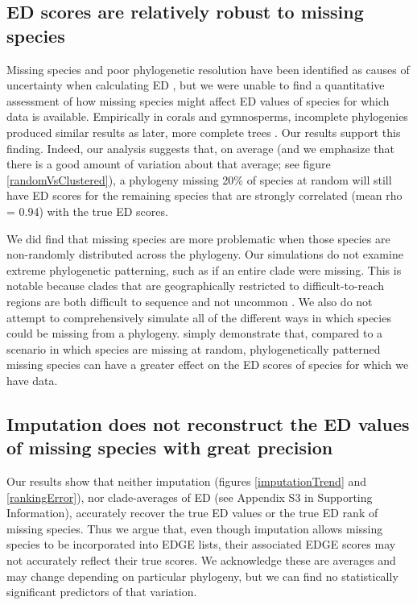 \documentclass[10pt,english]{article}
\begin{document}
\subsection*{ED scores are relatively robust to missing species}
Missing species and poor phylogenetic resolution have been identified as causes
of uncertainty when calculating ED \autocite{Isaac2007}, but we were unable to
find a quantitative assessment of how missing species might affect ED values of
species for which data is available. Empirically in corals and gymnosperms,
incomplete phylogenies produced similar results as later, more complete trees
\autocite{Curnick2015, Forest2018}. Our results support this finding. Indeed,
our analysis suggests that, on average (and we emphasize that there is a good
amount of variation about that average; see figure \ref{randomVsClustered}), a
phylogeny missing 20\% of species at random will still have ED scores for the
remaining species that are strongly correlated (mean rho = 0.94) with the true
ED scores.

We did find that missing species are more problematic when those species are
non-randomly distributed across the phylogeny. Our simulations do not examine
extreme phylogenetic patterning, such as if an entire clade were missing. This
is notable because clades that are geographically restricted to
difficult-to-reach regions are both difficult to sequence and not uncommon
\autocite[as is seen with 27 coral species in the Indian
Ocean;][]{Arrigoni2012}. We also do not attempt to comprehensively simulate all
of the different ways in which species could be missing from a phylogeny.
  simply demonstrate
that, compared to a scenario in which species are missing at random,
phylogenetically patterned missing species can have a greater effect on the ED
scores of species for which we have data.

\subsection*{Imputation does not reconstruct the ED values of missing species with great precision}
Our results show that neither imputation (figures \ref{imputationTrend} and
\ref{rankingError}), nor clade-averages of ED (see Appendix S3 in Supporting
Information), accurately recover the true ED values or the true ED rank of
missing species. Thus we argue that, even though imputation allows missing
species to be incorporated into EDGE lists, their associated EDGE scores may not
accurately reflect their true scores. We acknowledge these are averages and may
change depending on particular phylogeny, but we can find no statistically
significant predictors of that variation.
\end{document}
